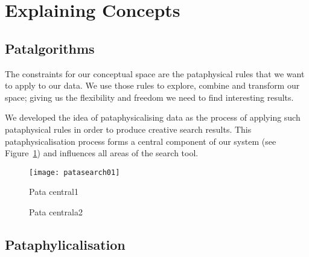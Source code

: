 

\section{Explaining Concepts}

\subsection{Patalgorithms}

\begin{draft}
  The constraints for our conceptual space are the pataphysical rules that we want to apply to our data. We use those rules to explore, combine and transform our space; giving us the flexibility and freedom we need to find interesting results.

  We developed the idea of pataphysicalising data as the process of applying such pataphysical rules in order to produce creative search results. This pataphysicalisation process forms a central component of our system (see Figure~\ref{fig:patasearch01}) and influences all areas of the search tool.
\end{draft}


\begin{figure}[htb] %
  \centering
  \texttt{[image: patasearch01]}
\caption[Pata central1]{Pata central1}
\label{fig:patasearch01}
\end{figure}

\begin{figure}[htb] %
  \centering
  
\caption[Pata centrala2]{Pata centrala2}
\label{fig:patasearch02}
\end{figure}


\subsection{Pataphylicalisation}


